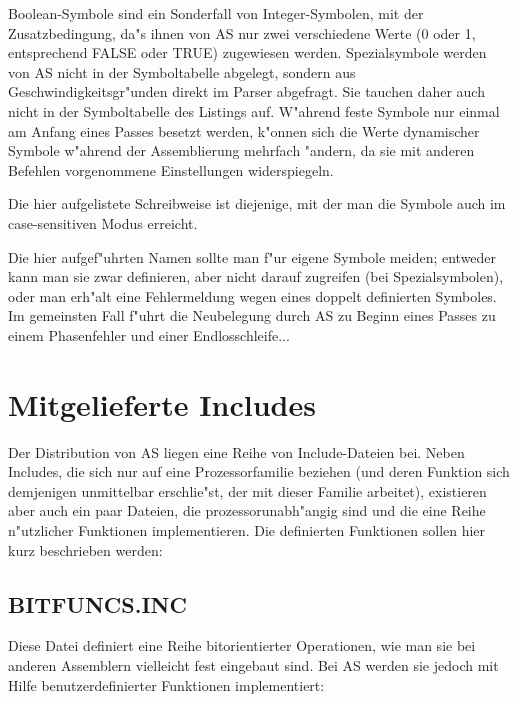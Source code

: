 \documentclass[12pt,a4paper,twoside]{report}
\newcommand{\asname}{AS}
\begin{document}
Boolean-Symbole sind ein Sonderfall von Integer-Symbolen, mit
der Zusatzbedingung, da"s ihnen von \asname{} nur zwei verschiedene Werte (0 oder
1, entsprechend FALSE oder TRUE) zugewiesen werden.  Spezialsymbole
werden von \asname{} nicht in der Symboltabelle abgelegt, sondern aus
Geschwindigkeitsgr"unden direkt im Parser abgefragt.  Sie tauchen daher
auch nicht in der Symboltabelle des Listings auf.  W"ahrend feste
Symbole nur einmal am Anfang eines Passes besetzt werden, k"onnen sich
die Werte dynamischer Symbole w"ahrend der Assemblierung mehrfach "andern,
da sie mit anderen Befehlen vorgenommene Einstellungen widerspiegeln.
\par
Die hier aufgelistete Schreibweise ist diejenige, mit der man die
Symbole auch im case-sensitiven Modus erreicht.
\par
Die hier aufgef"uhrten Namen sollte man f"ur eigene Symbole meiden;
entweder kann man sie zwar definieren, aber nicht darauf zugreifen
(bei Spezialsymbolen), oder man erh"alt eine Fehlermeldung wegen eines
doppelt definierten Symboles.  Im gemeinsten Fall f"uhrt die Neubelegung
durch \asname{} zu Beginn eines Passes zu einem Phasenfehler und einer
Endlosschleife...



\cleardoublepage
\chapter{Mitgelieferte Includes}

Der Distribution von \asname{} liegen eine Reihe von Include-Dateien bei.  Neben
Includes, die sich nur auf eine Prozessorfamilie beziehen (und deren
Funktion sich demjenigen unmittelbar erschlie"st, der mit dieser Familie
arbeitet), existieren aber auch ein paar Dateien, die prozessorunabh"angig
sind und die eine Reihe n"utzlicher Funktionen implementieren.  Die
definierten Funktionen sollen hier kurz beschrieben werden:

\section{BITFUNCS.INC}

Diese Datei definiert eine Reihe bitorientierter Operationen, wie man sie
bei anderen Assemblern vielleicht fest eingebaut sind.  Bei \asname{} werden sie
jedoch mit Hilfe benutzerdefinierter Funktionen implementiert:
\end{document}
